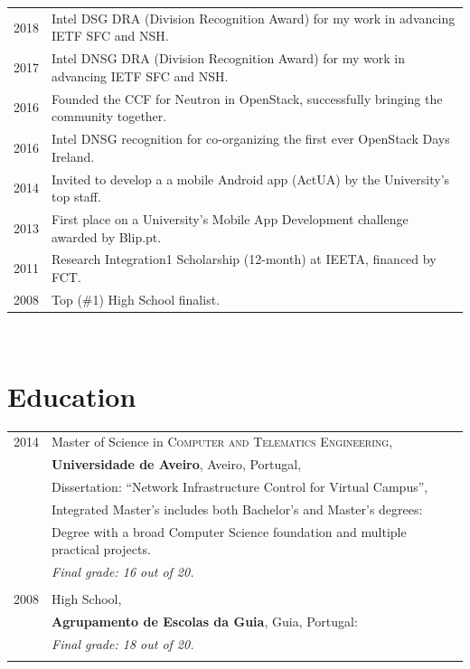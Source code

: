 \documentclass[letter,10pt]{article} %
\begin{document}
\begin{tabular}{rl}
    \textsc{2018} & Intel DSG DRA (Division Recognition Award) for my work in advancing IETF SFC and NSH. \normalsize\\
    \textsc{2017} & Intel DNSG DRA (Division Recognition Award) for my work in advancing IETF SFC and NSH. \normalsize\\
    \textsc{2016} & Founded the CCF for Neutron in OpenStack, successfully bringing the community together. \normalsize\\
    \textsc{2016} & Intel DNSG recognition for co-organizing the first ever OpenStack Days Ireland. \normalsize\\
    \textsc{2014} & Invited to develop a a mobile Android app (ActUA) by the University's top staff. \normalsize\\
    \textsc{2013} & First place on a University's Mobile App Development challenge awarded by Blip.pt. \normalsize\\
    \textsc{2011} & Research Integration1 Scholarship (12-month) at IEETA, financed by FCT. \normalsize\\
    \textsc{2008} & Top (\#1) High School finalist. \normalsize\\
\end{tabular} \\


\section{Education}

\begin{tabular}{rl}
    \textsc{2014} & Master of Science in \textsc{Computer and Telematics Engineering}, \\
    &\textbf{Universidade de Aveiro}, Aveiro, Portugal, \\
    & Dissertation: ``Network Infrastructure Control for Virtual Campus'', \\
    & Integrated Master's includes both Bachelor's and Master's degrees: \\
    & Degree with a broad Computer Science foundation and multiple practical projects.\\
    & \textit{Final grade: 16 out of 20.}\\
    &\\

    \textsc{2008} & High School, \\
    &\textbf{Agrupamento de Escolas da Guia}, Guia, Portugal: \\
    & \textit{Final grade: 18 out of 20.}\\
    &\\
\end{tabular}
\end{document}
